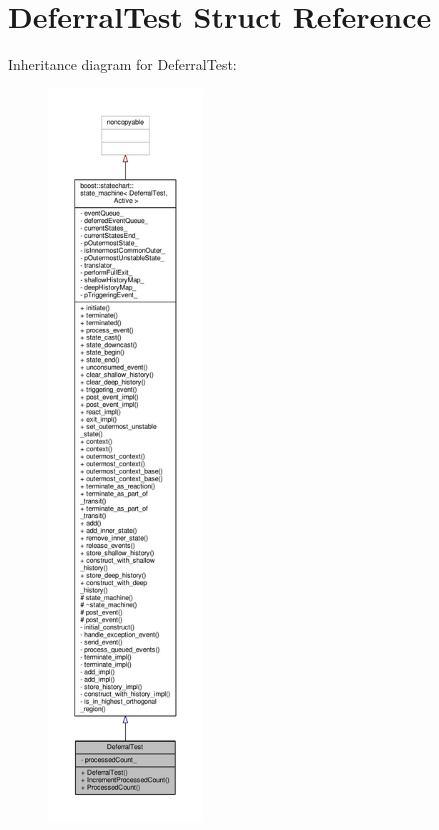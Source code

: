 \hypertarget{struct_deferral_test}{}\section{Deferral\+Test Struct Reference}
\label{struct_deferral_test}


Inheritance diagram for Deferral\+Test\+:
\nopagebreak
\begin{figure}[H]
\begin{center}
\leavevmode
\includegraphics[height=550pt]{struct_deferral_test__inherit__graph}
\end{center}
\end{figure}


